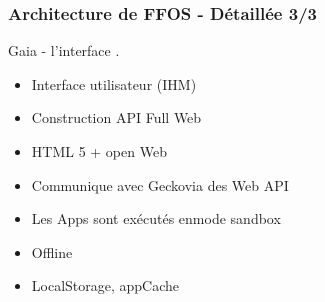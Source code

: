 \documentclass{beamer}
\begin{document}
\begin{frame}
\frametitle{Architecture de FFOS - Détaillée 3/3}
\begin{block}{Gaia - l'interface}
.
\begin{itemize}
\item Interface utilisateur (IHM)
\item Construction API Full Web
\item HTML 5 + open Web
\item Communique avec Geckovia des Web API
\item Les Apps sont exécutés enmode sandbox
\item Offline
\item LocalStorage, appCache
\end{itemize}
\end{block}
\end{frame}

\end{document}

